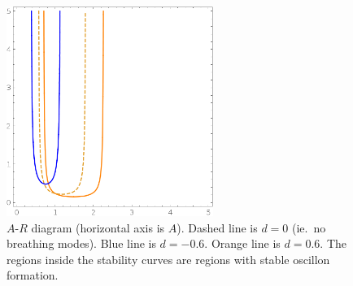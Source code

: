 \documentclass[11pt]{book}
\begin{document}
\begin{figure}\centering
  \includegraphics[width=0.6\textwidth]{plot/small-stability.png}
  \caption{$A$-$R$ diagram (horizontal axis is $A$). Dashed line is $d=0$ (ie.~no breathing modes). Blue line is $d=-0.6$. Orange line is $d=0.6$. The regions inside the stability curves are regions with stable oscillon formation.}\label{stability1}
\end{figure}
\end{document}
